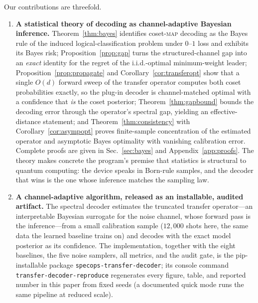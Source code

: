 \documentclass[reprint,aps,prxquantum,amsmath,amssymb,floatfix,nofootinbib,longbibliography]{revtex4-2}
\theoremstyle{definition}
\theoremstyle{remark}
\theoremstyle{plain}
\newcommand{\sync}[1]{#1}
\begin{document}
Our contributions are threefold.
\begin{enumerate}[leftmargin=1.6em,itemsep=0.15em,topsep=0.25em]
    \item \textbf{A statistical theory of decoding as channel-adaptive Bayesian inference.} Theorem~\ref{thm:bayes} identifies coset-\textsc{map} decoding as the Bayes rule of the induced logical-classification problem under $0$--$1$ loss and exhibits its Bayes risk; Proposition~\ref{prop:gap} turns the structured-channel gap into an \emph{exact} identity for the regret of the i.i.d.-optimal minimum-weight leader; Proposition~\ref{prop:propagate} and Corollary~\ref{cor:transferopt} show that a single $O(d)$ forward sweep of the transfer operator computes both coset probabilities exactly, so the plug-in decoder is channel-matched optimal with a confidence that \emph{is} the coset posterior; Theorem~\ref{thm:gapbound} bounds the decoding error through the operator's spectral gap, yielding an effective-distance statement; and Theorem~\ref{thm:consistency} with Corollary~\ref{cor:asympopt} proves finite-sample concentration of the estimated operator and asymptotic Bayes optimality with vanishing calibration error. Complete proofs are given in Sec.~\ref{sec:bayes} and Appendix~\ref{app:proofs}. The theory makes concrete the program's premise that statistics is structural to quantum computing: the device speaks in Born-rule samples, and the decoder that wins is the one whose inference matches the sampling law.
    \item \textbf{A channel-adaptive algorithm, released as an installable, audited artifact.} The spectral decoder estimates the truncated transfer operator---an interpretable Bayesian surrogate for the noise channel, whose forward pass is the inference---from a small calibration sample ($\sync{12{,}000}$ shots here, the same data the learned baseline trains on) and decodes with the exact model posterior as its confidence. The implementation, together with the eight baselines, the five noise samplers, all metrics, and the audit gate, is the pip-installable package \texttt{specops-transfer-decoder}; its console command \texttt{transfer-decoder-reproduce} regenerates every figure, table, and reported number in this paper from fixed seeds (a documented quick mode runs the same pipeline at reduced scale).

\end{enumerate}
\end{document}
